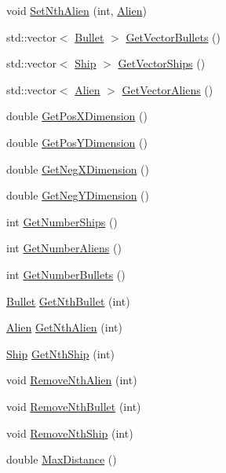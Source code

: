 \begin{DoxyCompactItemize}
\item 
void \hyperlink{classBoard_a14c341a116fe5a799d32e6a1a2ad20ee}{Set\-Nth\-Alien} (int, \hyperlink{classAlien}{Alien})
\item 
std\-::vector$<$ \hyperlink{classBullet}{Bullet} $>$ \hyperlink{classBoard_aa81904fe02e24f2c5a5a22cc7aa2fb1f}{Get\-Vector\-Bullets} ()
\item 
std\-::vector$<$ \hyperlink{classShip}{Ship} $>$ \hyperlink{classBoard_a5e8d02e9707a4d46bfd8e8f65534fef1}{Get\-Vector\-Ships} ()
\item 
std\-::vector$<$ \hyperlink{classAlien}{Alien} $>$ \hyperlink{classBoard_a4aa38aba86a511d21c73feca1f5a53fb}{Get\-Vector\-Aliens} ()
\item 
double \hyperlink{classBoard_a0d07f4d616e272a1af348b9baa4fbae8}{Get\-Pos\-X\-Dimension} ()
\item 
double \hyperlink{classBoard_acab8c54eb132148f63e7a2960e0ebf3b}{Get\-Pos\-Y\-Dimension} ()
\item 
double \hyperlink{classBoard_aa1d930101bd156faad5ae1be82d30bbd}{Get\-Neg\-X\-Dimension} ()
\item 
double \hyperlink{classBoard_ab0bb449aabb539140862a7ceafaea760}{Get\-Neg\-Y\-Dimension} ()
\item 
int \hyperlink{classBoard_a964557fa031a2e5bdc0b2373b6201124}{Get\-Number\-Ships} ()
\item 
int \hyperlink{classBoard_a730d8217b0c91db0e107fefd72d07d9c}{Get\-Number\-Aliens} ()
\item 
int \hyperlink{classBoard_af62cea43d3a2678ea4c26f0f97a60835}{Get\-Number\-Bullets} ()
\item 
\hyperlink{classBullet}{Bullet} \hyperlink{classBoard_a1bc49df815ee87e82febb809740bd18c}{Get\-Nth\-Bullet} (int)
\item 
\hyperlink{classAlien}{Alien} \hyperlink{classBoard_a30f5a1320952251822682bac58997802}{Get\-Nth\-Alien} (int)
\item 
\hyperlink{classShip}{Ship} \hyperlink{classBoard_aded42838351e68d691569ecb86a457f6}{Get\-Nth\-Ship} (int)
\item 
void \hyperlink{classBoard_a292c52a3ce8f34d2c9de72243b674a22}{Remove\-Nth\-Alien} (int)
\item 
void \hyperlink{classBoard_a8e4af42b6e217b7a9c0ddd2919af5e4e}{Remove\-Nth\-Bullet} (int)
\item 
void \hyperlink{classBoard_a6015ff8cd657852d0cfd2b849346256f}{Remove\-Nth\-Ship} (int)
\item 
double \hyperlink{classBoard_a284e60b74483ab485df669249d215ce7}{Max\-Distance} ()

\end{DoxyCompactItemize}
